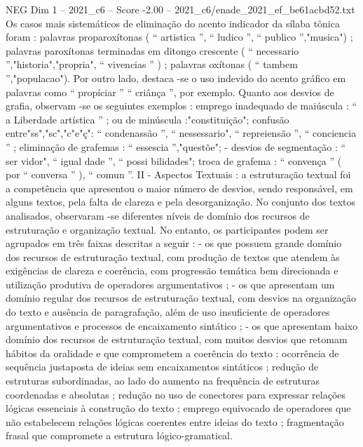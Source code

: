 \begin{textsample}{NEG Dim 1 – 2021\_c6 – Score -2.00 – 2021\_c6/enade\_2021\_ef\_be61acbd52.txt}
Os casos mais sistemáticos de eliminação do acento indicador da sílaba tônica foram : palavras proparoxítonas ( “ artistica ”, “ ludico ”, “ publico ”,"musica") ; palavras paroxítonas terminadas em ditongo crescente ( “ necessario ”,"historia","propria", “ vivencias ” ) ; palavras oxítonas ( “ tambem ”,"populacao").
Por outro lado, destaca -se o uso indevido do acento gráfico em palavras como “ propíciar ” “ criânça ”, por exemplo.
Quanto aos desvios de grafia, observam -se os seguintes exemplos : emprego inadequado de maiúscula : “ a Liberdade artística ” ; ou de minúscula :"constituição"; confusão entre"ss","sc","c"e"ç": “ condenassão ”, “ nessessario", “ repreiensão ”, “ conciencia ” ; eliminação de grafemas : “ essescia ”,"questõe"; - desvios de segmentação : “ ser vidor", “ igual dade ”, “ possi bilidades"; troca de grafema : “ convença ” ( por “ conversa ” ), “ comun ”.
II - Aspectos Textuais : a estruturação textual foi a competência que apresentou o maior número de desvios, sendo responsável, em alguns textos, pela falta de clareza e pela desorganização.
No conjunto dos textos analisados, observaram -se diferentes níveis de domínio dos recursos de estruturação e organização textual.
No entanto, os participantes podem ser agrupados em três faixas descritas a seguir : - os que possuem grande domínio dos recursos de estruturação textual, com produção de textos que atendem às exigências de clareza e coerência, com progressão temática bem direcionada e utilização produtiva de operadores argumentativos ; - os que apresentam um domínio regular dos recursos de estruturação textual, com desvios na organização do texto e ausência de paragrafação, além de uso insuficiente de operadores argumentativos e processos de encaixamento sintático ; - os que apresentam baixo domínio dos recursos de estruturação textual, com muitos desvios que retomam hábitos da oralidade e que comprometem a coerência do texto : ocorrência de sequência justaposta de ideias sem encaixamentos sintáticos ; redução de estruturas subordinadas, ao lado do aumento na frequência de estruturas coordenadas e absolutas ; redução no uso de conectores para expressar relações lógicas essenciais à construção do texto ; emprego equivocado de operadores que não estabelecem relações lógicas coerentes entre ideias do texto ; fragmentação frasal que compromete a estrutura lógico-gramatical.

\end{textsample}
